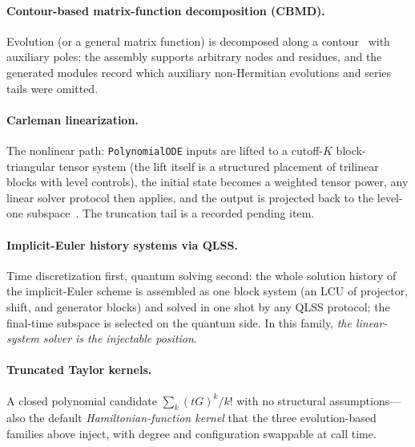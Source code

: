 \paragraph{Contour-based matrix-function decomposition (CBMD).}
Evolution (or a general matrix function) is decomposed along a contour~\cite{wang2026cbmd} with
auxiliary poles; the assembly supports arbitrary nodes and residues, and the
generated modules record which auxiliary non-Hermitian evolutions and series
tails were omitted.

\paragraph{Carleman linearization.}
The nonlinear path: \texttt{PolynomialODE} inputs are lifted to a cutoff-$K$
block-triangular tensor system (the lift itself is a structured placement of
trilinear blocks with level controls), the initial state becomes a weighted
tensor power, any linear solver protocol then applies, and the output is
projected back to the level-one subspace~\cite{liu2021pnas,liu2023carleman}.  The truncation tail is a recorded
pending item.

\paragraph{Implicit-Euler history systems via QLSS.}
Time discretization first, quantum solving second: the whole solution
history of the implicit-Euler scheme is assembled as one block system (an
LCU of projector, shift, and generator blocks) and solved in one shot by any
QLSS protocol; the final-time subspace is selected on the quantum side.  In
this family, \emph{the linear-system solver is the injectable position}.

\paragraph{Truncated Taylor kernels.}
A closed polynomial candidate $\sum_k (tG)^k/k!$ with no structural
assumptions---also the default \emph{Hamiltonian-function kernel} that the
three evolution-based families above inject, with degree and configuration
swappable at call time.

